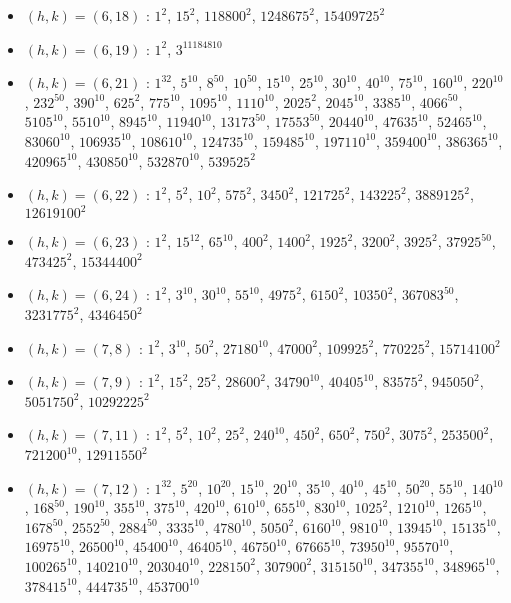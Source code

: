 \begin{itemize}
\item $(h,k)=(6,18)$ : $1^{2}$, $15^{2}$, $118800^{2}$, $1248675^{2}$, $15409725^{2}$
\item $(h,k)=(6,19)$ : $1^{2}$, $3^{11184810}$
\item $(h,k)=(6,21)$ : $1^{32}$, $5^{10}$, $8^{50}$, $10^{50}$, $15^{10}$, $25^{10}$, $30^{10}$, $40^{10}$, $75^{10}$, $160^{10}$, $220^{10}$, $232^{50}$, $390^{10}$, $625^{2}$, $775^{10}$, $1095^{10}$, $1110^{10}$, $2025^{2}$, $2045^{10}$, $3385^{10}$, $4066^{50}$, $5105^{10}$, $5510^{10}$, $8945^{10}$, $11940^{10}$, $13173^{50}$, $17553^{50}$, $20440^{10}$, $47635^{10}$, $52465^{10}$, $83060^{10}$, $106935^{10}$, $108610^{10}$, $124735^{10}$, $159485^{10}$, $197110^{10}$, $359400^{10}$, $386365^{10}$, $420965^{10}$, $430850^{10}$, $532870^{10}$, $539525^{2}$
\item $(h,k)=(6,22)$ : $1^{2}$, $5^{2}$, $10^{2}$, $575^{2}$, $3450^{2}$, $121725^{2}$, $143225^{2}$, $3889125^{2}$, $12619100^{2}$
\item $(h,k)=(6,23)$ : $1^{2}$, $15^{12}$, $65^{10}$, $400^{2}$, $1400^{2}$, $1925^{2}$, $3200^{2}$, $3925^{2}$, $37925^{50}$, $473425^{2}$, $15344400^{2}$
\item $(h,k)=(6,24)$ : $1^{2}$, $3^{10}$, $30^{10}$, $55^{10}$, $4975^{2}$, $6150^{2}$, $10350^{2}$, $367083^{50}$, $3231775^{2}$, $4346450^{2}$
\item $(h,k)=(7,8)$ : $1^{2}$, $3^{10}$, $50^{2}$, $27180^{10}$, $47000^{2}$, $109925^{2}$, $770225^{2}$, $15714100^{2}$
\item $(h,k)=(7,9)$ : $1^{2}$, $15^{2}$, $25^{2}$, $28600^{2}$, $34790^{10}$, $40405^{10}$, $83575^{2}$, $945050^{2}$, $5051750^{2}$, $10292225^{2}$
\item $(h,k)=(7,11)$ : $1^{2}$, $5^{2}$, $10^{2}$, $25^{2}$, $240^{10}$, $450^{2}$, $650^{2}$, $750^{2}$, $3075^{2}$, $253500^{2}$, $721200^{10}$, $12911550^{2}$
\item $(h,k)=(7,12)$ : $1^{32}$, $5^{20}$, $10^{20}$, $15^{10}$, $20^{10}$, $35^{10}$, $40^{10}$, $45^{10}$, $50^{20}$, $55^{10}$, $140^{10}$, $168^{50}$, $190^{10}$, $355^{10}$, $375^{10}$, $420^{10}$, $610^{10}$, $655^{10}$, $830^{10}$, $1025^{2}$, $1210^{10}$, $1265^{10}$, $1678^{50}$, $2552^{50}$, $2884^{50}$, $3335^{10}$, $4780^{10}$, $5050^{2}$, $6160^{10}$, $9810^{10}$, $13945^{10}$, $15135^{10}$, $16975^{10}$, $26500^{10}$, $45400^{10}$, $46405^{10}$, $46750^{10}$, $67665^{10}$, $73950^{10}$, $95570^{10}$, $100265^{10}$, $140210^{10}$, $203040^{10}$, $228150^{2}$, $307900^{2}$, $315150^{10}$, $347355^{10}$, $348965^{10}$, $378415^{10}$, $444735^{10}$, $453700^{10}$

\end{itemize}
